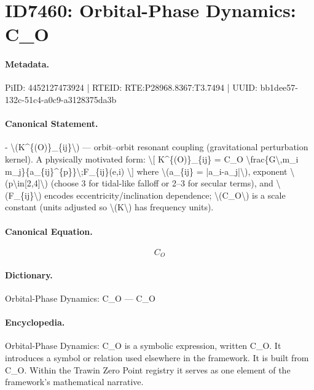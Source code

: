 \section*{ID7460: Orbital-Phase Dynamics: C\_O}
\paragraph{Metadata.}
PiID: 4452127473924 | RTEID: RTE:P28968.8367:T3.7494 | UUID: bb1dee57-132c-51c4-a0c9-a3128375da3b

\paragraph{Canonical Statement.}
- \textbackslash{}(K\textasciicircum{}\{(O)\}\_\{ij\}\textbackslash{}) — orbit–orbit resonant coupling (gravitational perturbation kernel). A physically motivated form: \textbackslash{}[ K\textasciicircum{}\{(O)\}\_\{ij\} = C\_O \textbackslash{}frac\{G\textbackslash{},m\_i m\_j\}\{a\_\{ij\}\textasciicircum{}\{p\}\}\textbackslash{};F\_\{ij\}(e,i) \textbackslash{}] where \textbackslash{}(a\_\{ij\} = |a\_i-a\_j|\textbackslash{}), exponent \textbackslash{}(p\textbackslash{}in[2,4]\textbackslash{}) (choose 3 for tidal-like falloff or 2–3 for secular terms), and \textbackslash{}(F\_\{ij\}\textbackslash{}) encodes eccentricity/inclination dependence; \textbackslash{}(C\_O\textbackslash{}) is a scale constant (units adjusted so \textbackslash{}(K\textbackslash{}) has frequency units).

\paragraph{Canonical Equation.}
\[
C_O
\]

\paragraph{Dictionary.}
Orbital-Phase Dynamics: C\_O — C\_O

\paragraph{Encyclopedia.}
Orbital-Phase Dynamics: C\_O is a symbolic expression, written C\_O. It introduces a symbol or relation used elsewhere in the framework. It is built from C\_O. Within the Trawin Zero Point registry it serves as one element of the framework's mathematical narrative.

